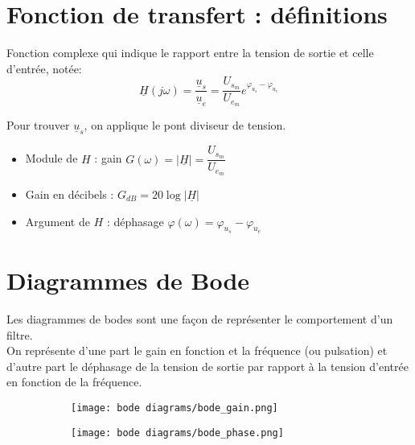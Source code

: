 \documentclass{article}
\begin{document}
    \section{Fonction de transfert : définitions}

    Fonction complexe qui indique le rapport entre la tension de sortie et celle d'entrée, notée: 
    $$\underline{H}(j\omega) = \dfrac{\underline{u}_s}{\underline{u}_e} = \dfrac{U_{s_m}}{U_{e_m}} e^{\varphi_{u_s} - \varphi_{u_e}}$$
    
    Pour trouver $\underline{u}_s$, on applique le pont diviseur de tension.

    \begin{itemize}[label=$\ast$]
        \item Module de $H$ : gain $G(\omega) = \left|\underline{H}\right| = \dfrac{U_{s_m}}{U_{e_m}}$
        \item Gain en décibels : $G_{dB} = 20\log{\left|\underline{H}\right|}$
        \item Argument de $H$ : déphasage $\varphi(\omega) = \varphi_{u_s} - \varphi_{u_e}$
    \end{itemize}



    \section{Diagrammes de Bode}

    Les diagrammes de bodes sont une façon de représenter le comportement d'un filtre.\\
    On représente d'une part le gain en fonction et la fréquence (ou pulsation) et d'autre part le déphasage de la tension de sortie par rapport à la tension d'entrée en fonction de la fréquence.

    \begin{figure}[ht]
        \centering
        \begin{subfigure}{0.48\textwidth}
            \centering
            \texttt{[image: bode diagrams/bode\_gain.png]}
        \end{subfigure}
        \hfill\begin{subfigure}{0.48\textwidth}
            \centering
            \texttt{[image: bode diagrams/bode\_phase.png]}
        \end{subfigure}
    \end{figure}
\end{document}
